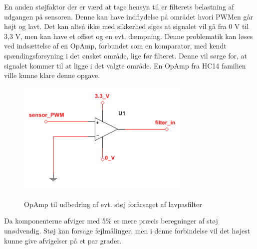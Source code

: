 En anden støjfaktor der er værd at tage hensyn til er filterets belastning af udgangen på sensoren. Denne kan have indflydelse på området hvori PWMen går højt og lavt. Det kan altså ikke med sikkerhed siges at signalet vil gå fra 0 V til 3,3 V, men kan have et offset og en evt. dæmpning. Denne problematik kan løses ved indsættelse af en OpAmp, forbundet som en komparator, med kendt spændingsforsyning i det ønsket område, lige før filteret. Denne vil sørge for, at signalet kommer til at ligge i det valgte område. En OpAmp fra HC14 familien ville kunne klare denne opgave. 

\begin{figure}[htb]
\centering
{\includegraphics[width=0.75\textwidth]{filer/design/Billeder/sht_opamp}}
\caption{OpAmp til udbedring af evt. støj forårsaget af lavpasfilter}
\label{lab:sht_opamp}
\end{figure}

Da komponenterne afviger med 5\% er mere præcis beregninger af støj unødvendig. Støj kan forsage fejlmålinger, men i denne forbindelse vil det højest kunne give afvigelser på et par grader.
